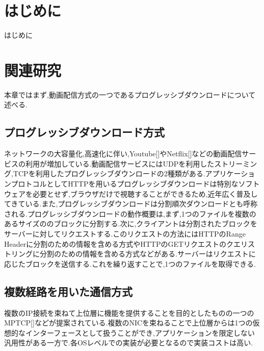 \documentclass[a4j,12pt]{gradthesis_utf8}
\begin{document}
 
\maketitle %

\chapter{はじめに}\label{sec:sec1}
はじめに
\chapter{関連研究}\label{sec:sec2}
本章ではまず,動画配信方式の一つであるプログレッシブダウンロードについて述べる.

\section{プログレッシブダウンロード方式}
ネットワークの大容量化,高速化に伴い,Youtube[]やNetflix[]などの動画配信サービスの利用が増加している.動画配信サービスにはUDPを利用したストリーミング,TCPを利用したプログレッシブダウンロードの2種類がある.アプリケーションプロトコルとしてHTTPを用いるプログレッシブダウンロードは特別なソフトウェアを必要とせず,ブラウザだけで視聴することができるため,近年広く普及してきている.また,プログレッシブダウンロードは分割順次ダウンロードとも呼称される.プログレッシブダウンロードの動作概要は,まず,1つのファイルを複数のあるサイズののブロックに分割する.次に,クライアントは分割されたブロックをサーバーに対してリクエストする.このリクエストの方法にはHTTPのRange Headerに分割のための情報を含める方式やHTTPのGETリクエストのクエリストリングに分割のための情報を含める方式などがある.サーバーはリクエストに応じたブロックを送信する.これを繰り返すことで,1つのファイルを取得できる.

 \section{複数経路を用いた通信方式}
 複数のIP接続を束ねて上位層に機能を提供することを目的としたものの一つのMPTCP[]などが提案されている.複数のNICを束ねることで上位層からは1つの仮想的なインターフェースとして扱うことができ,アプリケーションを限定しない汎用性がある一方で.各OSレベルでの実装が必要となるので実装コストは高い.
 
\end{document}
